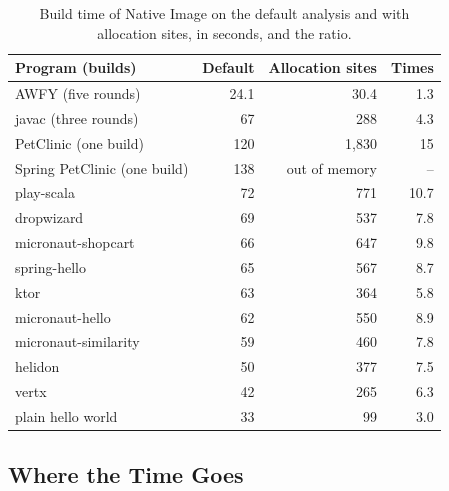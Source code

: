 \begin{table}[t]
    \centering
    \caption{Build time of Native Image on the default analysis and with allocation sites, in seconds, and the ratio.}
    \label{tab:eval-sites}
    \footnotesize
    \begin{tabular}{lrrr}
        \toprule
        Program (builds) & Default & Allocation sites & Times \\
        \midrule
        AWFY (five rounds)                  & 24.1 & 30.4 & 1.3 \\
        javac (three rounds)               & 67   & 288  & 4.3 \\
        PetClinic (one build)              & 120  & 1,830 & 15 \\
        \midrule
        Spring PetClinic (one build)       & 138 & out of memory & -- \\
        play-scala                          & 72   & 771  & 10.7 \\
        dropwizard                          & 69   & 537  & 7.8 \\
        micronaut-shopcart                  & 66   & 647  & 9.8 \\
        spring-hello                        & 65   & 567  & 8.7 \\
        ktor                                & 63   & 364  & 5.8 \\
        micronaut-hello                     & 62   & 550  & 8.9 \\
        micronaut-similarity                & 59   & 460  & 7.8 \\
        helidon                             & 50   & 377  & 7.5 \\
        vertx                               & 42   & 265  & 6.3 \\
        plain hello world                   & 33   & 99   & 3.0 \\
        \bottomrule
    \end{tabular}
\end{table}

\subsection{Where the Time Goes}\label{sec:eval-cost-steps}

